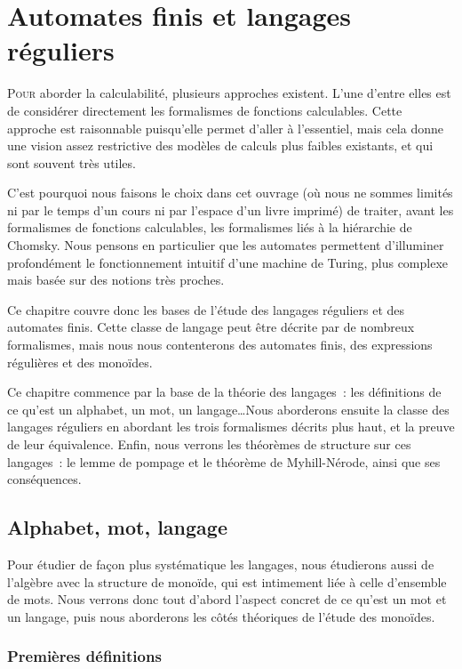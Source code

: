 \chapter{Automates finis et langages réguliers}
\label{chp.auto}

\minitoc

\lettrine{P}{our} aborder la calculabilité, plusieurs approches existent. L'une
d'entre elles est de considérer directement les formalismes de fonctions
calculables. Cette approche est raisonnable puisqu'elle permet d'aller à
l'essentiel, mais cela donne une vision assez restrictive des modèles de calculs
plus faibles existants, et qui sont souvent très utiles.

C'est pourquoi nous faisons le choix dans cet ouvrage (où nous ne sommes limités
ni par le temps d'un cours ni par l'espace d'un livre imprimé) de traiter, avant
les formalismes de fonctions calculables, les formalismes liés à la hiérarchie
de Chomsky. Nous pensons en particulier que les automates permettent d'illuminer
profondément le fonctionnement intuitif d'une machine de Turing, plus complexe
mais basée sur des notions très proches.

Ce chapitre couvre donc les bases de l'étude des langages réguliers et des
automates finis. Cette classe de langage peut être décrite par de nombreux
formalismes, mais nous nous contenterons des automates finis, des expressions
régulières et des monoïdes.

Ce chapitre commence par la base de la théorie des langages~: les définitions
de ce qu'est un alphabet, un mot, un langage\ldots Nous aborderons ensuite la
classe des langages réguliers en abordant les trois formalismes décrits plus
haut, et la preuve de leur équivalence. Enfin, nous verrons les théorèmes de
structure sur ces langages~: le lemme de pompage et le théorème de
Myhill-Nérode, ainsi que ses conséquences.

\section{Alphabet, mot, langage}

Pour étudier de façon plus systématique les langages, nous étudierons aussi de
l'algèbre avec la structure de monoïde, qui est intimement liée à celle
d'ensemble de mots. Nous verrons donc tout d'abord l'aspect concret de ce qu'est
un mot et un langage, puis nous aborderons les côtés théoriques de l'étude des
monoïdes.

\subsection{Premières définitions}

